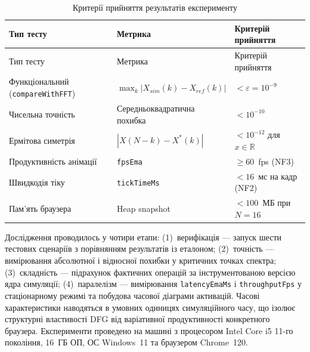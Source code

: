 \begin{longtable}[]{@{}
  >{\raggedright\arraybackslash}p{}
  >{\raggedright\arraybackslash}p{}
  >{\raggedright\arraybackslash}p{}@{}}
\caption[Критерії прийняття результатів]{Критерії прийняття результатів
експерименту}\tabularnewline
\toprule\noalign{}
\begin{minipage}[b]{\linewidth}\raggedright
Тип тесту
\end{minipage} & \begin{minipage}[b]{\linewidth}\raggedright
Метрика
\end{minipage} & \begin{minipage}[b]{\linewidth}\raggedright
Критерій прийняття
\end{minipage} \\
\midrule\noalign{}
\endfirsthead
\toprule\noalign{}
\begin{minipage}[b]{\linewidth}\raggedright
Тип тесту
\end{minipage} & \begin{minipage}[b]{\linewidth}\raggedright
Метрика
\end{minipage} & \begin{minipage}[b]{\linewidth}\raggedright
Критерій прийняття
\end{minipage} \\
\midrule\noalign{}
\endhead
\bottomrule\noalign{}
\endlastfoot
Функціональний (\texttt{compareWithFFT}) &
\(\max_k|X_{sim}(k)-X_{ref}(k)|\) & \(<\varepsilon=10^{-9}\) \\
Чисельна точність & Середньоквадратична похибка & \(<10^{-10}\) \\
Ермітова симетрія & \(|X(N-k)-X^*(k)|\) & \(<10^{-12}\) для
\(x\in\mathbb{R}\) \\
Продуктивність анімації & \texttt{fpsEma} & \(\geq60\)~fps (NF3) \\
Швидкодія тіку & \texttt{tickTimeMs} & \(<16\)~мс на кадр (NF2) \\
Пам'ять браузера & Heap snapshot & \(<100\)~МБ при \(N=16\) \\
\end{longtable}

Дослідження проводилось у чотири етапи: (1)~верифікація --- запуск шести
тестових сценаріїв з порівнянням результатів із еталоном; (2)~точність ---
вимірювання абсолютної і відносної похибки у критичних точках спектра;
(3)~складність --- підрахунок фактичних операцій за інструментованою
версією ядра симуляції; (4)~паралелізм --- вимірювання
\texttt{latencyEmaMs} і \texttt{throughputFps} у стаціонарному режимі та
побудова часової діаграми активацій. Часові характеристики наводяться в
умовних одиницях симуляційного часу, що ізолює структурні властивості DFG
від варіативної продуктивності конкретного браузера. Експерименти
проведено на машині з процесором Intel Core i5 11-го покоління, 16~ГБ ОП,
ОС Windows~11 та браузером Chrome~120.

